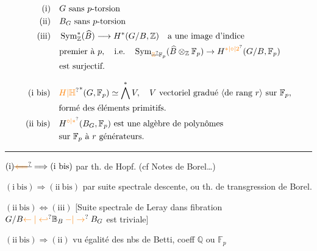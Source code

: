\[
\begin{aligned}
\mathrm{(i)}\quad &G\text{ sans }p\text{-torsion}\\
\mathrm{(ii)}\quad &B_G\text{ sans }p\text{-torsion}\\
\mathrm{(iii)}\quad &\operatorname{Sym}^{*}_{\mathbb Z}(\widehat B)\longrightarrow H^*(G/B,\mathbb Z)
  \quad\text{a une image d'indice}\\
&\text{premier à }p,\quad\text{i.e.}\quad
  \operatorname{Sym}_{\deleted{\unsure{\mathbb Z}}\mathbb F_p}(\widehat B\otimes_{\mathbb Z}\mathbb F_p)\to H^{\unsure{*|\circ|2}}(G/B,\mathbb F_p)\\
&\text{est surjectif.}
\end{aligned}
\]

\[
\begin{aligned}
\mathrm{(i\ bis)}\quad &{\unsure{H|\mathbb H}}^{*}(G,\mathbb F_p)\simeq\bigwedge^{*}V,\quad V\text{ vectoriel gradué \inserted{de rang $r$} sur }\mathbb F_p,\\
&\text{formé des éléments primitifs.}\\
\mathrm{(ii\ bis)}\quad &H^{\unsure{\circ|*}}(B_G,\mathbb F_p)\text{ est une algèbre de polynômes}\\
&\text{sur }\mathbb F_p\text{ à }r\text{ générateurs.}
\end{aligned}
\]

\par\noindent\hfil\rule{.47\linewidth}{.4pt}\hfil\par


$\mathrm{(i)}\deleted{\unsure{\Longleftarrow}}\Longrightarrow\mathrm{(i\ bis)}$ par th. de Hopf. (cf Notes de Borel\ldots{})

$\mathrm{(i\ bis)}\Longrightarrow\mathrm{(ii\ bis)}$ par suite spectrale  descente, ou th. de transgression de Borel.

$\mathrm{(ii\ bis)}\Longleftrightarrow\mathrm{(iii)}$ [Suite spectrale de Leray dans fibration $G/B\unsure{\leftarrow|\hookleftarrow}\mathbb B_B\mathbin{\unsure{-|\to}}B_G$ est triviale] 

$\mathrm{(ii\ bis)}\Longrightarrow\mathrm{(ii)}$ vu égalité des nbs de Betti, coeff $\mathbb Q$ ou $\mathbb F_p$

